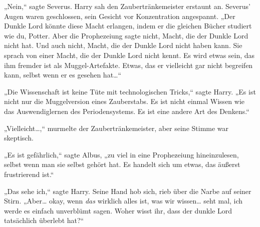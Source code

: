 

„Nein,“ sagte Severus. Harry sah den Zaubertränkemeister erstaunt an. Severus' Augen waren geschlossen, sein Gesicht vor Konzentration angespannt. „Der Dunkle Lord könnte diese Macht erlangen, indem er die gleichen Bücher studiert wie du, Potter. Aber die Prophezeiung sagte nicht, Macht, die der Dunkle Lord nicht hat. Und auch nicht, Macht, die der Dunkle Lord nicht haben kann. Sie sprach von einer Macht, die der Dunkle Lord nicht kennt. Es wird etwas sein, das ihm fremder ist als Muggel-Artefakte. Etwas, das er vielleicht gar nicht begreifen kann, selbst wenn er es gesehen hat…“

„Die Wissenschaft ist keine Tüte mit technologischen Tricks,“ sagte Harry. „Es ist nicht nur die Muggelversion eines Zauberstabs. Es ist nicht einmal Wissen wie das Auswendiglernen des Periodensystems. Es ist eine andere Art des Denkens.“

„Vielleicht…,“ murmelte der Zaubertränkemeister, aber seine Stimme war skeptisch.

„Es ist gefährlich,“ sagte Albus, „zu viel in eine Prophezeiung hineinzulesen, selbst wenn man sie selbst gehört hat. Es handelt sich um etwas, das äußerst frustrierend ist.“

„Das sehe ich,“ sagte Harry. Seine Hand hob sich, rieb über die Narbe auf seiner Stirn. „Aber… okay, wenn \emph{das} wirklich alles ist, was wir wissen… seht mal, ich werde es einfach unverblümt sagen. Woher wisst ihr, dass der dunkle Lord tatsächlich überlebt hat?“

